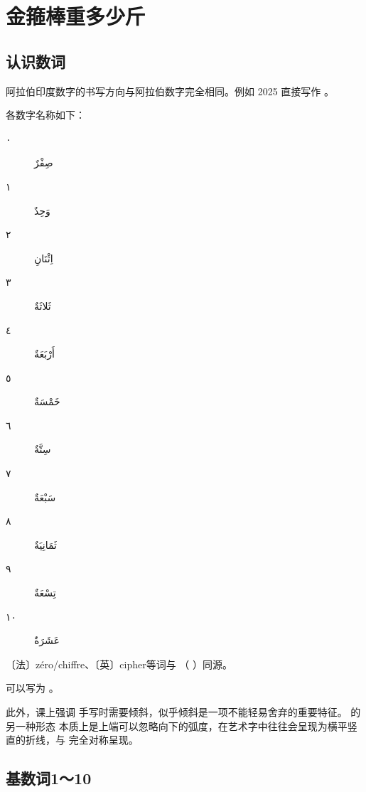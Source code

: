 \chapter{金箍棒重多少斤}

\section{ 认识数词}


阿拉伯印度数字的书写方向与阿拉伯数字完全相同。例如 2025 直接写作 。

各数字名称如下：

\begin{Arabic}
    \begin{multicols}{2}
    \begin{description}
        \item[٠] صِفْرٌ
        \item[١] وَحِدٌ
        \item[٢] اِثْنَانِ
        \item[٣] ثَلاثَةٌ
        \item[٤] أَرْبَعَةٌ
        \item[٥] خَمْسَةٌ
        \item[٦] سِتَّةٌ
        \item[٧] سَبْعَةٌ
        \item[٨] ثَمَانِيَةٌ
        \item[٩] تِسْعَةٌ
        \item[١٠] عَشَرَةٌ
    \end{description}
    \end{multicols}
\end{Arabic}

〔法〕zéro/chiffre、〔英〕cipher等词与 （  ）同源。

\newfontfamily{}

\begin{attention}
     可以写为 。
\end{attention}

\begin{note}
    此外，课上强调  手写时需要倾斜，似乎倾斜是一项不能轻易舍弃的重要特征。  的另一种形态  本质上是上端可以忽略向下的弧度，在艺术字中往往会呈现为横平竖直的折线，与  完全对称呈现。
\end{note}

\section{  基数词1～10}

